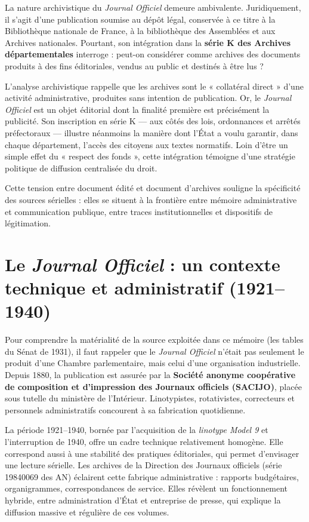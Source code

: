 La nature archivistique du \emph{Journal Officiel} demeure ambivalente. Juridiquement, il s’agit d’une publication soumise au dépôt légal, conservée à ce titre à la Bibliothèque nationale de France, à la bibliothèque des Assemblées et aux Archives nationales. Pourtant, son intégration dans la \textbf{série K des Archives départementales} interroge : peut-on considérer comme archives des documents produits à des fins éditoriales, vendus au public et destinés à être lus ?

L’analyse archivistique rappelle que les archives sont le « collatéral direct » d’une activité administrative, produites sans intention de publication. Or, le \emph{Journal Officiel} est un objet éditorial dont la finalité première est précisément la publicité. Son inscription en série K — aux côtés des lois, ordonnances et arrêtés préfectoraux — illustre néanmoins la manière dont l’État a voulu garantir, dans chaque département, l’accès des citoyens aux textes normatifs. Loin d’être un simple effet du « respect des fonds », cette intégration témoigne d’une stratégie politique de diffusion centralisée du droit.

Cette tension entre document édité et document d’archives souligne la spécificité des sources sérielles : elles se situent à la frontière entre mémoire administrative et communication publique, entre traces institutionnelles et dispositifs de légitimation.

\section{Le \emph{Journal Officiel} : un contexte technique et administratif (1921–1940)}

Pour comprendre la matérialité de la source exploitée dans ce mémoire (les tables du Sénat de 1931), il faut rappeler que le \emph{Journal Officiel} n’était pas seulement le produit d’une Chambre parlementaire, mais celui d’une organisation industrielle. Depuis 1880, la publication est assurée par la \textbf{Société anonyme coopérative de composition et d’impression des Journaux officiels (SACIJO)}, placée sous tutelle du ministère de l’Intérieur. Linotypistes, rotativistes, correcteurs et personnels administratifs concourent à sa fabrication quotidienne.

La période 1921–1940, bornée par l’acquisition de la \emph{linotype Model 9} et l’interruption de 1940, offre un cadre technique relativement homogène. Elle correspond aussi à une stabilité des pratiques éditoriales, qui permet d’envisager une lecture sérielle. Les archives de la Direction des Journaux officiels (série 19840069 des AN) éclairent cette fabrique administrative : rapports budgétaires, organigrammes, correspondances de service. Elles révèlent un fonctionnement hybride, entre administration d’État et entreprise de presse, qui explique la diffusion massive et régulière de ces volumes.

